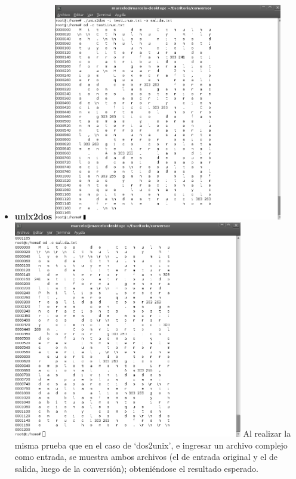\documentclass[a4paper,10pt]{article}
\begin{document}
\begin{itemize}
      \item \textbf{unix2dos}
      \newline
      \includegraphics[width=10cm, viewport=0 0 837 798]{../Informe/Imagenes/prueba3-archivo-unix2dos1.png}
      \newline
      \includegraphics[width=10cm, viewport=0 0 841 799]{../Informe/Imagenes/prueba3-archivo-unix2dos2.png}		
      \newline
      Al realizar la misma prueba que en el caso de `dos2unix', e ingresar un archivo complejo como entrada, se muestra
      ambos archivos (el de entrada original y el de salida, luego de la conversi\'on); obteni\'endose el resultado esperado.
      
      \end{itemize}
\end{document}
